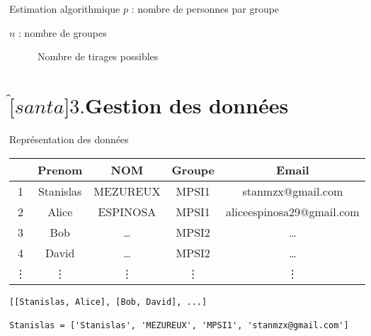 \documentclass[10pt, compress]{beamer}
\begin{document}
  \begin{frame}{Estimation algorithmique}
    $p$ : nombre de personnes par groupe 
    
    $n$ : nombre de groupes
    \begin{figure}
      \caption{Nombre de tirages possibles}
    \end{figure}
  \end{frame}

\section{$\hat[santa]{\text{3.}}$\quad Gestion des données}

  \begin{frame}[fragile]{Représentation des données}
    \begin{table}
      \begin{tabular}{ccccc}
          \hline
          & Prenom & NOM & Groupe & Email\\
          \hline
          1 & Stanislas & MEZUREUX & MPSI1 & stanmzx@gmail.com \\
          2 & Alice & ESPINOSA & MPSI1 & aliceespinosa29@gmail.com \\
          3 & Bob & \ldots & MPSI2 & \ldots \\
          4 & David & \ldots & MPSI2 & \ldots \\
          \vdots & \vdots & \vdots & \vdots & \vdots \\
          \hline
      \end{tabular}
    \end{table}
    \begin{longlisting}
      \caption{Format des données manipulées}
      \begin{verbatim}
[[Stanislas, Alice], [Bob, David], ...]

Stanislas = ['Stanislas', 'MEZUREUX', 'MPSI1', 'stanmzx@gmail.com']
      \end{verbatim}
    \end{longlisting}
  \end{frame}
\end{document}
